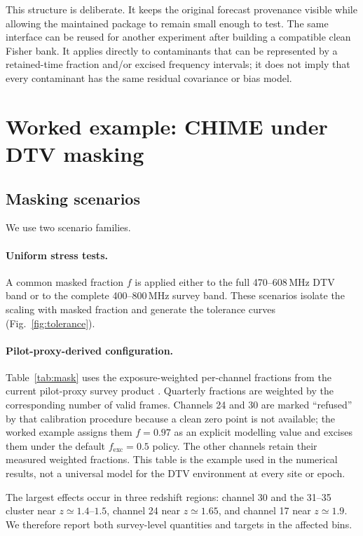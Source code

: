 This structure is deliberate. It keeps the original forecast provenance
visible while allowing the maintained package to remain small enough to
test. The same interface can be reused for another experiment after
building a compatible clean Fisher bank. It applies directly to
contaminants that can be represented by a retained-time fraction and/or
excised frequency intervals; it does not imply that every contaminant
has the same residual covariance or bias model.

\section{Worked example: CHIME under DTV masking}
\label{sec:example}

\subsection{Masking scenarios}
\label{sec:scenarios}

We use two scenario families.

\paragraph{Uniform stress tests.}
A common masked fraction $f$ is applied either to the full
470--608\,MHz DTV band or to the complete 400--800\,MHz survey band.
These scenarios isolate the scaling with masked fraction and generate
the tolerance curves (Fig.~\ref{fig:tolerance}).

\paragraph{Pilot-proxy-derived configuration.}
Table~\ref{tab:mask} uses the exposure-weighted per-channel fractions
from the current pilot-proxy survey product \citep{PilotProxy}.
Quarterly fractions are weighted by the corresponding number of valid
frames. Channels 24 and 30 are marked ``refused'' by that calibration
procedure because a clean zero point is not available; the worked
example assigns them $f=0.97$ as an explicit modelling value and
excises them under the default $f_\mathrm{exc}=0.5$ policy. The other
channels retain their measured weighted fractions. This table is the
example used in the numerical results, not a universal model for the
DTV environment at every site or epoch.

The largest effects occur in three redshift regions: channel 30 and the
31--35 cluster near $z\simeq1.4$--$1.5$, channel 24 near
$z\simeq1.65$, and channel 17 near $z\simeq1.9$. We therefore report
both survey-level quantities and targets in the affected bins.

